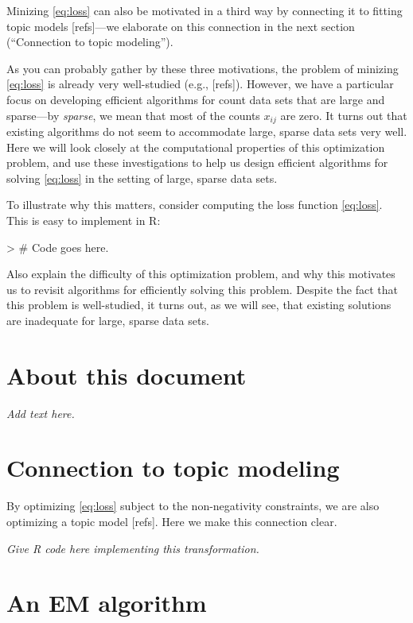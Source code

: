 \documentclass[final]{siamart171218}
\begin{document}
Minizing \eqref{eq:loss} can also be motivated in a third way by
connecting it to fitting topic models [refs]---we elaborate on this
connection in the next section (``Connection to topic modeling'').

As you can probably gather by these three motivations, the problem of
minizing \eqref{eq:loss} is already very well-studied (e.g.,
[refs]). However, we have a particular focus on developing efficient
algorithms for count data sets that are large and sparse---by {\em
  sparse}, we mean that most of the counts $x_{ij}$ are zero. It
turns out that existing algorithms do not seem to accommodate large,
sparse data sets very well. Here we will look closely at the
computational properties of this optimization problem, and use these
investigations to help us design efficient algorithms for solving
\eqref{eq:loss} in the setting of large, sparse data sets.

To illustrate why this matters, consider computing the loss function
\eqref{eq:loss}. This is easy to implement in R:
\begin{Schunk}
\begin{Sinput}
> # Code goes here.
\end{Sinput}
\end{Schunk}

Also explain the difficulty of this optimization problem, and why this
motivates us to revisit algorithms for efficiently solving this
problem. Despite the fact that this problem is well-studied, it turns
out, as we will see, that existing solutions are inadequate for large,
sparse data sets.

\section{About this document}

{\em Add text here.}

\section{Connection to topic modeling}

By optimizing \eqref{eq:loss} subject to the non-negativity
constraints, we are also optimizing a topic model [refs]. Here we make
this connection clear.

{\em Give R code here implementing this transformation.}

\section{An EM algorithm}
\end{document}
